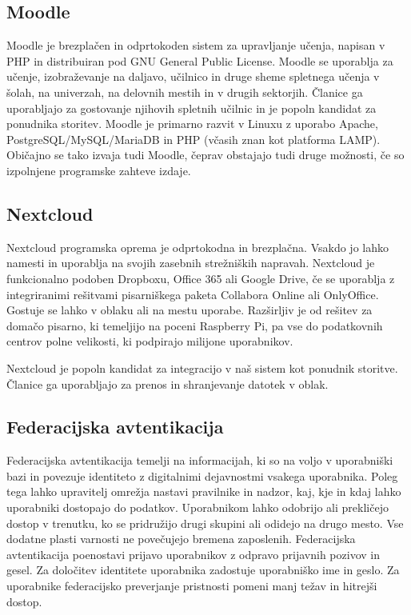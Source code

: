 \documentclass[a4paper,12pt,openright,oneside]{book}
\begin{document}
\subsection{Moodle}
Moodle \cite{Moodle} je brezplačen in odprtokoden sistem za upravljanje učenja, napisan v PHP in distribuiran pod GNU General Public License. Moodle se uporablja za učenje, izobraževanje na daljavo, učilnico in druge sheme spletnega učenja v šolah, na univerzah, na delovnih mestih in v drugih sektorjih.
\newline
Članice ga uporabljajo za gostovanje njihovih spletnih učilnic in je popoln kandidat za ponudnika storitev.
Moodle je primarno razvit v Linuxu z uporabo Apache, PostgreSQL/MySQL/MariaDB in PHP (včasih znan kot platforma LAMP). Običajno se tako izvaja tudi Moodle, čeprav obstajajo tudi druge možnosti, če so izpolnjene programske zahteve izdaje.
\subsection{Nextcloud}

Nextcloud \cite{nextcloud} programska oprema je odprtokodna in brezplačna. Vsakdo jo lahko namesti in uporablja na svojih zasebnih strežniških napravah. 
Nextcloud je funkcionalno podoben Dropboxu, Office 365 ali Google Drive, če se uporablja z integriranimi rešitvami pisarniškega paketa Collabora Online ali OnlyOffice. Gostuje se lahko v oblaku ali na mestu uporabe. Razširljiv je od rešitev za domačo pisarno, ki temeljijo na poceni Raspberry Pi, pa vse do podatkovnih centrov polne velikosti, ki podpirajo milijone uporabnikov.

Nextcloud je popoln kandidat za integracijo v naš sistem kot ponudnik storitve. Članice ga uporabljajo za prenos in shranjevanje datotek v oblak. 

\subsection{Federacijska avtentikacija}
Federacijska avtentikacija temelji na informacijah, ki so na voljo v uporabniški bazi in povezuje identiteto z digitalnimi dejavnostmi vsakega uporabnika. Poleg tega lahko upravitelj omrežja nastavi pravilnike in nadzor, kaj, kje in kdaj lahko uporabniki dostopajo do podatkov. Uporabnikom lahko odobrijo ali prekličejo dostop v trenutku, ko se pridružijo drugi skupini ali odidejo na drugo mesto.
\newline
Vse dodatne plasti varnosti ne povečujejo bremena zaposlenih. Federacijska avtentikacija poenostavi prijavo uporabnikov z odpravo prijavnih pozivov in gesel. Za določitev identitete uporabnika zadostuje uporabniško ime in geslo. Za uporabnike federacijsko preverjanje pristnosti pomeni manj težav in hitrejši dostop.
\end{document}
